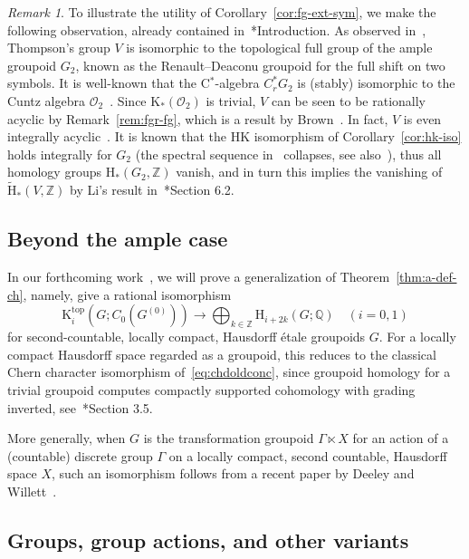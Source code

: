 \documentclass[a4paper,reqno]{amsart}
\theoremstyle{plain}
\theoremstyle{definition}
\theoremstyle{remark}
\newtheorem{remark}[theorem]{Remark}
\numberwithin{equation}{section}
\newcommand{\rH}{\mathrm{H}}
\newcommand{\rK}{\mathrm{K}}
\newcommand{\cO}{\mathcal{O}}
\newcommand{\dQ}{\mathbb{Q}}
\newcommand{\dZ}{\mathbb{Z}}
\begin{document}
\begin{remark}
To illustrate the utility of Corollary~\ref{cor:fg-ext-sym}, we make the following observation, already contained in~\cite{li:algk}*{Introduction}.
As observed in~\cite{nekra:v}, Thompson's group $V$ is isomorphic to the topological full group of the ample groupoid $G_2$, known as the Renault--Deaconu groupoid for the full shift on two symbols.
It is well-known that the C$^*$-algebra $C^*_r G_2$ is (stably) isomorphic to the Cuntz algebra $\cO_2$~\cite{cuntz:otwo}.
Since $\rK_*(\cO_2)$ is trivial, $V$ can be seen to be rationally acyclic by Remark~\ref{rem:fgr-fg}, which is a result by Brown~\cite{brown:fp}.
In fact, $V$ is even integrally acyclic~\cite{sw:ht}.
It is known that the HK isomorphism of Corollary~\ref{cor:hk-iso} holds integrally for $G_2$ (the spectral sequence in~\cite{py:part-one} collapses, see also~\cite{fkps:hk}), thus all homology groups $\rH_*(G_2,\dZ)$ vanish, and in turn this implies the vanishing of $\tilde{\rH}_*(V,\dZ)$ by Li's result in~\cite{li:algk}*{Section 6.2}.
\end{remark}

\subsection{Beyond the ample case}%

In our forthcoming work~\cite{py:upcoming}, we will prove a generalization of Theorem~\ref{thm:a-def-ch}, namely, give a rational isomorphism
\[
\rK_i^{\mathrm{top}}(G; C_0(G^{(0)})) \to \bigoplus_{k\in \dZ} \rH_{i+2k}(G; \dQ) \quad (i = 0, 1)
\]
for second-countable, locally compact, Hausdorff étale groupoids $G$.
For a locally compact Hausdorff space regarded as a groupoid, this reduces to the classical Chern character isomorphism of~\eqref{eq:chdoldconc}, since groupoid homology for a trivial groupoid computes compactly supported cohomology with grading inverted, see~\cite{cramo:hom}*{Section 3.5}.

More generally, when $G$ is the transformation groupoid $\Gamma \ltimes X$ for an action of a (countable) discrete group $\Gamma$ on a locally compact, second countable, Hausdorff space $X$, such an isomorphism follows from a recent paper by Deeley and Willett~\cite{dw:hk}. 

\subsection{Groups, group actions, and other variants}
\end{document}
